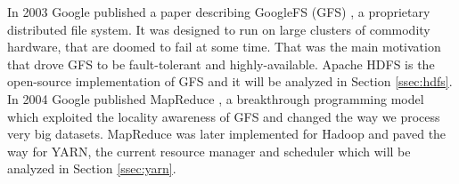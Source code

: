 In 2003 Google published a paper describing GoogleFS (GFS)
\cite{Ghemawat:2003:GFS:1165389.945450}, a proprietary distributed
file system. It was designed to run on large clusters of commodity
hardware, that are doomed to fail at some time. That was the main
motivation that drove GFS to be fault-tolerant and
highly-available. Apache HDFS is the open-source implementation of GFS
and it will be analyzed in Section \ref{ssec:hdfs}. In 2004 Google
published MapReduce \cite{Dean:2004:MSD:1251254.1251264}, a breakthrough programming model which exploited the locality
awareness of GFS and changed the way we process very big
datasets. MapReduce was later implemented for Hadoop and paved the way
for YARN, the current resource manager and scheduler 
which will be analyzed in Section \ref{ssec:yarn}.
